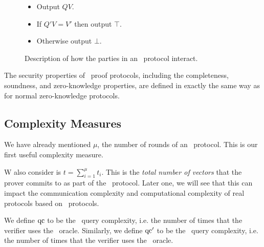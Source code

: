 \begin{figure}[!h]
{\begin{minipage}[t]{6.5cm}
\begin{algorithm}[H]
\caption*{\ILCopen($Q$)}
\begin{itemize}
\item Output $QV$.
\end{itemize}
\end{algorithm}
\begin{algorithm}[H]
\caption*{\ILCcheck($Q', V'$)}
\begin{itemize}
\item If $Q'V = V'$ then output $\top$.
\item Otherwise output $\bot$.
\end{itemize}
\end{algorithm}
\end{minipage}
}
\caption{Description of how the parties in an \ILC\ protocol interact.}
\label{fig:ILCpseudocode}
\end{figure}

The security properties of \ILC\ proof protocols, including the completeness, soundness, and zero-knowledge properties, are defined in exactly the same way as for normal zero-knowledge protocols.

\subsection{Complexity Measures}

We have already mentioned $\mu$, the number of rounds of an \ILC\ protocol. This is our first useful complexity measure.

W also consider is $t = \sum_{i=1}^\mu t_i$. This is the \emph{total number of vectors} that the prover commits to as part of the \ILC\ protocol. Later one, we will see that this can impact the communication complexity and computational complexity of real protocols based on \ILC\ protocols.

We define $\mathrm{qc}$ to be the \ILCopen\ query complexity, i.e. the number of times that the verifier uses the \ILCopen\ oracle. Similarly, we define $\mathrm{qc}'$ to be the \ILCcheck\ query complexity, i.e. the number of times that the verifier uses the \ILCcheck\ oracle. 


